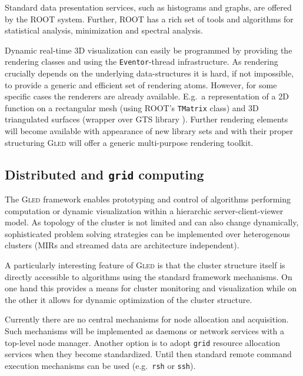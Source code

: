 \documentclass[a4paper,11pt]{article}
\def\gled{\textsc{Gled}\xspace}
\def\grid{\texttt{grid}\xspace}
\def\smalltt#1{{\small\texttt{#1}}}
\begin{document}
Standard data presentation services, such as histograms and graphs,
are offered by the ROOT system. Further, ROOT has a rich set of tools
and algorithms for statistical analysis, minimization and spectral
analysis.

Dynamic real-time 3D visualization can easily be programmed by
providing the rendering classes and using the \smalltt{Eventor}-thread
infrastructure. As rendering crucially depends on the underlying
data-structures it is hard, if not impossible, to provide a generic
and efficient set of rendering atoms. However, for some specific cases
the renderers are already available. E.g.\ a representation of a 2D
function on a rectangular mesh (using ROOT's \smalltt{TMatrix} class)
and 3D triangulated surfaces (wrapper over GTS library \cite{gts}).
Further rendering elements will become available with appearance of
new library sets and with their proper structuring \gled will offer a
generic multi-purpose rendering toolkit.

\subsection{Distributed and \grid computing}

The \gled framework enables prototyping and control of algorithms
performing computation or dynamic visualization within a hierarchic
server-client-viewer model. As topology of the cluster is not limited
and can also change dynamically, sophisticated problem solving
strategies can be implemented over heterogenous clusters (MIRs and
streamed data are architecture independent).

A particularly interesting feature of \gled is that the cluster
structure itself is directly accessible to algorithms using the
standard framework mechanisms. On one hand this provides a means for
cluster monitoring and visualization while on the other it allows for
dynamic optimization of the cluster structure.

Currently there are no central mechanisms for node allocation and
acquisition. Such mechanisms will be implemented as daemons or network
services with a top-level node manager. Another option is to adopt \grid
resource allocation services when they become standardized. Until then
standard remote command execution mechanisms can be used (e.g.\ 
\smalltt{rsh} or \smalltt{ssh}).
\end{document}

